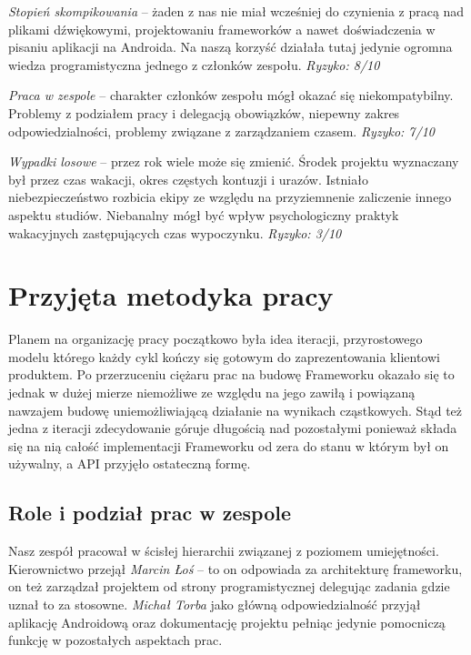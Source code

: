 \noindent\emph{Stopień skompikowania} -- żaden z nas nie miał wcześniej do czynienia z pracą nad plikami
dźwiękowymi, projektowaniu frameworków a nawet doświadczenia w pisaniu aplikacji na Androida. Na
naszą korzyść działała tutaj jedynie ogromna wiedza programistyczna jednego z członków zespołu. \emph{Ryzyko: 8/10}

\noindent\emph{Praca w zespole} -- charakter członków zespołu mógł okazać się niekompatybilny. Problemy z podziałem pracy i delegacją obowiązków, niepewny zakres odpowiedzialności, problemy związane z zarządzaniem czasem. \emph{Ryzyko: 7/10} 

\noindent\emph{Wypadki losowe} -- przez rok wiele może się zmienić. Środek projektu wyznaczany był przez czas wakacji, okres częstych kontuzji i urazów. Istniało niebezpieczeństwo rozbicia ekipy ze względu na przyziemnenie zaliczenie innego aspektu studiów. Niebanalny mógł być wpływ psychologiczny praktyk wakacyjnych zastępujących czas wypoczynku. \emph{Ryzyko: 3/10} 

\chapter{Przyjęta metodyka pracy}

Planem na organizację pracy początkowo była idea iteracji, przyrostowego modelu którego każdy cykl
kończy się gotowym do zaprezentowania klientowi produktem. Po przerzuceniu ciężaru prac na budowę
Frameworku okazało się to jednak w dużej mierze niemożliwe ze względu na jego zawiłą i powiązaną
nawzajem budowę uniemożliwiającą działanie na wynikach cząstkowych. Stąd też jedna z iteracji
zdecydowanie góruje długością nad pozostałymi ponieważ składa się na nią całość implementacji
Frameworku od zera do stanu w którym był on używalny, a API przyjęło ostateczną formę.

\section{Role i podział prac w zespole}

Nasz zespół pracował w ścisłej hierarchii związanej z poziomem umiejętności. Kierownictwo przejął
\emph{Marcin Łoś} -- to on odpowiada za architekturę frameworku, on też zarządzał projektem od
strony programistycznej delegując zadania gdzie uznał to za stosowne. \emph{Michał Torba} jako
główną odpowiedzialność przyjął aplikację Androidową oraz dokumentację projektu pełniąc jedynie
pomocniczą funkcję w pozostałych aspektach prac.

